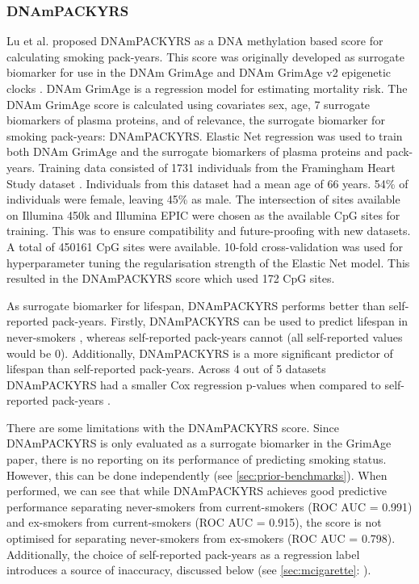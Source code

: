 \documentclass{article}
\begin{document}
\subsubsection{DNAmPACKYRS} \label{sec:dnampackyrs}
Lu et al. \cite{lu2019dna} proposed DNAmPACKYRS as a DNA methylation based score for calculating smoking pack-years. This score was originally developed as surrogate biomarker for use in the DNAm GrimAge and DNAm GrimAge v2 epigenetic clocks \cite{lu2019dna,lu2022dna}. DNAm GrimAge is a regression model for estimating mortality risk. The DNAm GrimAge score is calculated using covariates sex, age, 7 surrogate biomarkers of plasma proteins, and of relevance, the surrogate biomarker for smoking pack-years: DNAmPACKYRS. Elastic Net regression was used to train both DNAm GrimAge and the surrogate biomarkers of plasma proteins and pack-years. Training data consisted of 1731 individuals from the Framingham Heart Study dataset \cite{doi:10.2105/AJPH.41.3.279}. Individuals from this dataset had a mean age of 66 years. 54\% of individuals were female, leaving 45\% as male. The intersection of sites available on Illumina 450k and Illumina EPIC were chosen as the available CpG sites for training. This was to ensure compatibility and future-proofing with new datasets. A total of \num{450161} CpG sites were available. 10-fold cross-validation was used for hyperparameter tuning the regularisation strength of the Elastic Net model. This resulted in the DNAmPACKYRS score which used 172 CpG sites.

As surrogate biomarker for lifespan, DNAmPACKYRS performs better than self-reported pack-years. Firstly, DNAmPACKYRS can be used to predict lifespan in never-smokers \cite{lu2019dna}, whereas self-reported pack-years cannot (all self-reported values would be 0). Additionally, DNAmPACKYRS is a more significant predictor of lifespan than self-reported pack-years. Across 4 out of 5 datasets DNAmPACKYRS had a smaller Cox regression p-values when compared to self-reported pack-years \cite{lu2019dna}.

There are some limitations with the DNAmPACKYRS score. Since DNAmPACKYRS is only evaluated as a surrogate biomarker in the GrimAge paper, there is no reporting on its performance of predicting smoking status. However, this can be done independently (see \ref{sec:prior-benchmarks}). When performed, we can see that while DNAmPACKYRS achieves good predictive performance separating never-smokers from current-smokers (ROC AUC = 0.991) and ex-smokers from current-smokers (ROC AUC = 0.915), the score is not optimised for separating never-smokers from ex-smokers (ROC AUC = 0.798). Additionally, the choice of self-reported pack-years as a regression label introduces a source of inaccuracy, discussed below (see \ref{sec:mcigarette}: ).
\end{document}
